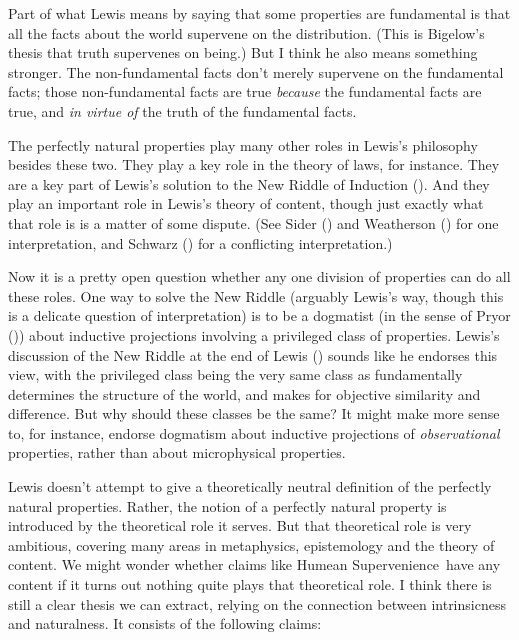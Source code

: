 \documentclass[
  10pt,
  letterpaper,
  DIV=11,
  numbers=noendperiod,
  twoside]{scrartcl}
\begin{document}
Part of what Lewis means by saying that some properties are fundamental
is that all the facts about the world supervene on the distribution.
(This is Bigelow's thesis that truth supervenes on being.) But I think
he also means something stronger. The non-fundamental facts don't merely
supervene on the fundamental facts; those non-fundamental facts are true
\emph{because} the fundamental facts are true, and \emph{in virtue of}
the truth of the fundamental facts.

The perfectly natural properties play many other roles in Lewis's
philosophy besides these two. They play a key role in the theory of
laws, for instance. They are a key part of Lewis's solution to the New
Riddle of Induction (). And they
play an important role in Lewis's theory of content, though just exactly
what that role is is a matter of some dispute. (See Sider
() and Weatherson
() for one interpretation, and
Schwarz () for a conflicting
interpretation.)

Now it is a pretty open question whether any one division of properties
can do all these roles. One way to solve the New Riddle (arguably
Lewis's way, though this is a delicate question of interpretation) is to
be a dogmatist (in the sense of Pryor ())
about inductive projections involving a privileged class of properties.
Lewis's discussion of the New Riddle at the end of Lewis
() sounds like he endorses this view,
with the privileged class being the very same class as fundamentally
determines the structure of the world, and makes for objective
similarity and difference. But why should these classes be the same? It
might make more sense to, for instance, endorse dogmatism about
inductive projections of \emph{observational} properties, rather than
about microphysical properties.

Lewis doesn't attempt to give a theoretically neutral definition of the
perfectly natural properties. Rather, the notion of a perfectly natural
property is introduced by the theoretical role it serves. But that
theoretical role is very ambitious, covering many areas in metaphysics,
epistemology and the theory of content. We might wonder whether claims
like Humean Supervenience~have any content if it turns out nothing quite
plays that theoretical role. I think there is still a clear thesis we
can extract, relying on the connection between intrinsicness and
naturalness. It consists of the following claims:
\end{document}

